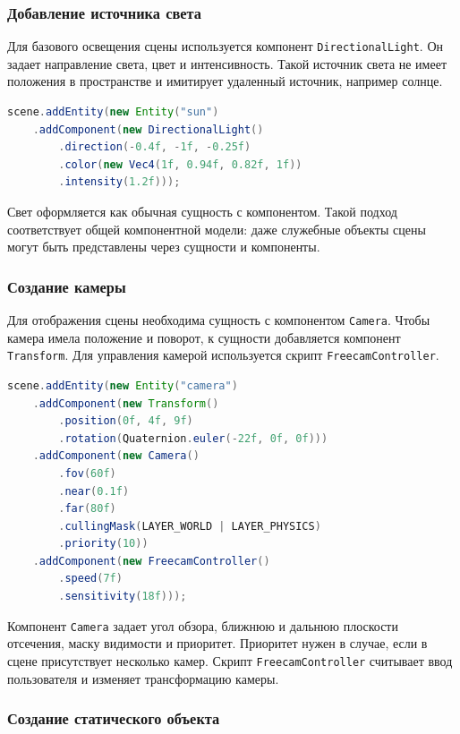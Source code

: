\subsubsection{Добавление источника света}

Для базового освещения сцены используется компонент \texttt{DirectionalLight}. Он задает направление света, цвет и интенсивность. Такой источник света не имеет положения в пространстве и имитирует удаленный источник, например солнце.

\begin{lstlisting}[language=Java,caption={Создание направленного источника света}]
scene.addEntity(new Entity("sun")
    .addComponent(new DirectionalLight()
        .direction(-0.4f, -1f, -0.25f)
        .color(new Vec4(1f, 0.94f, 0.82f, 1f))
        .intensity(1.2f)));
\end{lstlisting}

Свет оформляется как обычная сущность с компонентом. Такой подход соответствует общей компонентной модели: даже служебные объекты сцены могут быть представлены через сущности и компоненты.

\subsubsection{Создание камеры}

Для отображения сцены необходима сущность с компонентом \texttt{Camera}. Чтобы камера имела положение и поворот, к сущности добавляется компонент \texttt{Transform}. Для управления камерой используется скрипт \texttt{FreecamController}.

\begin{lstlisting}[language=Java,caption={Создание свободной камеры}]
scene.addEntity(new Entity("camera")
    .addComponent(new Transform()
        .position(0f, 4f, 9f)
        .rotation(Quaternion.euler(-22f, 0f, 0f)))
    .addComponent(new Camera()
        .fov(60f)
        .near(0.1f)
        .far(80f)
        .cullingMask(LAYER_WORLD | LAYER_PHYSICS)
        .priority(10))
    .addComponent(new FreecamController()
        .speed(7f)
        .sensitivity(18f)));
\end{lstlisting}

Компонент \texttt{Camera} задает угол обзора, ближнюю и дальнюю плоскости отсечения, маску видимости и приоритет. Приоритет нужен в случае, если в сцене присутствует несколько камер. Скрипт \texttt{FreecamController} считывает ввод пользователя и изменяет трансформацию камеры.

\subsubsection{Создание статического объекта}

